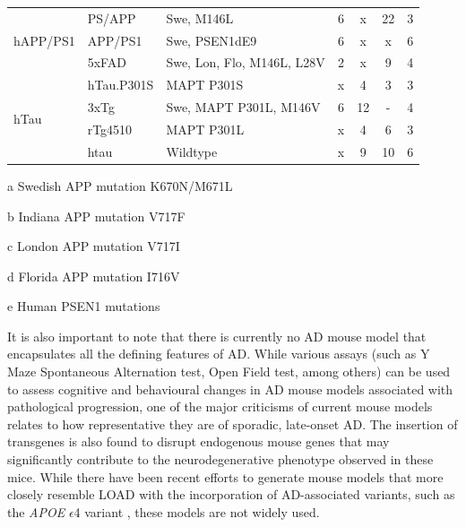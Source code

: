 \begin{table}[h]
\begin{threeparttable}
\begin{tabular}{@{}lllcccc@{}}
			\multirow{3}{*}{hAPP/PS1} & PS/APP & Swe\tnote{a}, M146L\tnote{e}                 & 6  & x  & 22    & 3                \\
			& APP/PS1         & Swe\tnote{a}, PSEN1dE9              & 6  & x  & x     & 6                \\
			& 5xFAD                 & Swe\tnote{a}, Lon\tnote{a}, Flo\tnote{c}, M146L\tnote{e}, L28V\tnote{e} & 2  & x  & 9     & 4                \\
			\multirow{4}{*}{hTau}     & hTau.P301S            & MAPT P301S                 & x  & 4  & 3     & 3                \\
			& 3xTg                  & Swe\tnote{a}, MAPT P301L, M146V     & 6  & 12 & -    & 4                \\
			& rTg4510               & MAPT P301L                 & x  & 4  & 6     & 3                \\
			& htau                  & Wildtype                   & x  & 9  & 10    & 6                \\ \cmidrule(l){1-7} 
		\end{tabular}
		\begin{tablenotes}
			\footnotesize
			\item[a] Swedish APP mutation K670N/M671L
			\item[b] Indiana APP mutation V717F
			\item[c] London APP mutation V717I
			\item[d] Florida APP mutation I716V 
			\item[e] Human PSEN1 mutations 
		\end{tablenotes}
	\end{threeparttable}
\end{table}

It is also important to note that there is currently no AD mouse model that encapsulates all the defining features of AD. While various assays (such as Y Maze Spontaneous Alternation test, Open Field test, among others) can be used to assess cognitive and behavioural changes in AD mouse models associated with pathological progression, one of the major criticisms of current mouse models relates to how representative they are of sporadic, late-onset AD. The insertion of transgenes is also found to disrupt endogenous mouse genes that may significantly contribute to the neurodegenerative phenotype observed in these mice\cite{Gamache2019}. While there have been recent efforts to generate mouse models that more closely resemble LOAD with the incorporation of AD-associated variants, such as the \textit{APOE} $\epsilon$4 variant \cite{apoe4trem2_mousemodel,Lewandowski2020}, these models are not widely used. 

